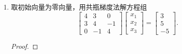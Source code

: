 \documentclass[a4paper]{article}
\begin{document}
\begin{enumerate}
  \item 取初始向量为零向量，用共瓶梯度法解方程组
  $$\begin{bmatrix}4 & 3 & 0 \\ 3 & 4 & -1 \\ 0 & -1 & 4\end{bmatrix}\begin{bmatrix}x_{1} \\ x_{2} \\ x_{3}\end{bmatrix}=\begin{bmatrix}3 \\ 5 \\ -5\end{bmatrix}.$$
  \begin{proof}
  
  \end{proof}
\end{enumerate}
\end{document}
